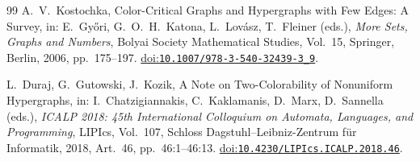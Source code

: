 \documentclass[11pt]{amsart}
\theoremstyle{definition}
\theoremstyle{remark}
\newcommand{\doi}[1]{\href{https://doi.org/#1}{doi:\nolinkurl{#1}}}
\begin{document}
\begin{thebibliography}{99}
A.~V.~Kostochka,
Color-Critical Graphs and Hypergraphs with Few Edges: A Survey,
in: E.~Gy\H{o}ri, G.~O.~H.~Katona, L.~Lov\'asz, T.~Fleiner (eds.),
\emph{More Sets, Graphs and Numbers},
Bolyai Society Mathematical Studies, Vol.~15,
Springer, Berlin, 2006, pp.~175--197.
\doi{10.1007/978-3-540-32439-3_9}.

L.~Duraj, G.~Gutowski, J.~Kozik,
A Note on Two-Colorability of Nonuniform Hypergraphs,
in: I.~Chatzigiannakis, C.~Kaklamanis, D.~Marx, D.~Sannella (eds.),
\emph{ICALP 2018: 45th International Colloquium on Automata, Languages, and Programming},
LIPIcs, Vol.~107,
Schloss Dagstuhl--Leibniz-Zentrum f{\"u}r Informatik, 2018, Art.~46, pp.~46:1--46:13.
\doi{10.4230/LIPIcs.ICALP.2018.46}.

\end{thebibliography}
\end{document}
